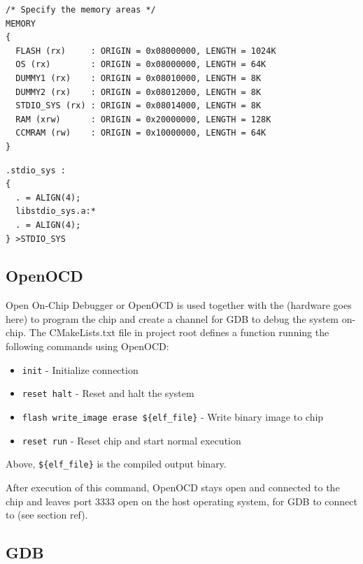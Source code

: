\begin{lstlisting}[firstnumber=40,
	caption=\textit{third\_party/linker\_scripts/STM32F415RG\_FLASH.ld}]
/* Specify the memory areas */
MEMORY
{
  FLASH (rx)     : ORIGIN = 0x08000000, LENGTH = 1024K
  OS (rx)        : ORIGIN = 0x08000000, LENGTH = 64K
  DUMMY1 (rx)    : ORIGIN = 0x08010000, LENGTH = 8K
  DUMMY2 (rx)    : ORIGIN = 0x08012000, LENGTH = 8K
  STDIO_SYS (rx) : ORIGIN = 0x08014000, LENGTH = 8K
  RAM (xrw)      : ORIGIN = 0x20000000, LENGTH = 128K
  CCMRAM (rw)    : ORIGIN = 0x10000000, LENGTH = 64K
}
\end{lstlisting}

\begin{lstlisting}[firstnumber=77,
	caption=\textit{third\_party/linker\_scripts/STM32F415RG\_FLASH.ld}]
.stdio_sys :
{
  . = ALIGN(4);
  libstdio_sys.a:*
  . = ALIGN(4);
} >STDIO_SYS
\end{lstlisting}

\subsection{OpenOCD}
\label{ssec:openocd}
Open On-Chip Debugger or OpenOCD \cite{openocd} is used together with the (hardware goes here) to program the chip and create a channel for GDB to debug the system on-chip.
The CMakeLists.txt file in project root defines a function running the following commands using OpenOCD:

\begin{itemize}
	\item \texttt{init} - Initialize connection
	\item \texttt{reset halt} - Reset and halt the system
	\item \texttt{flash write\_image erase \$\{elf\_file\}} - Write binary image to chip
	\item \texttt{reset run} - Reset chip and start normal execution
\end{itemize}

Above, \texttt{\$\{elf\_file\}} is the compiled output binary.

After execution of this command, OpenOCD stays open and connected to the chip and leaves port 3333 open on the host operating system, for GDB to connect to (see section ref).

\subsection{GDB}


